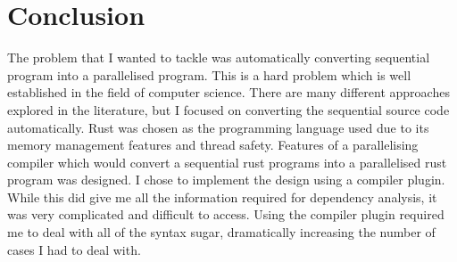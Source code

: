 \chapter{Conclusion}
The problem that I wanted to tackle was automatically converting sequential program into a parallelised program. This is a hard problem which is well established in the field of computer science. There are many different approaches explored in the literature, but I focused on converting the sequential source code automatically. Rust was chosen as the programming language used due to its memory management features and thread safety. Features of a parallelising compiler which would convert a sequential rust programs into a parallelised rust program was designed.  I chose to implement the design using a compiler plugin. While this did give me all the information required for dependency analysis, it was very complicated and difficult to access. Using the compiler plugin required me to deal with all of the syntax sugar, dramatically increasing the number of cases I had to deal with.


